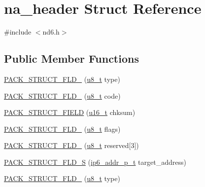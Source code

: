 \hypertarget{structna__header}{}\section{na\+\_\+header Struct Reference}
\label{structna__header}


{\ttfamily \#include $<$nd6.\+h$>$}

\subsection*{Public Member Functions}
\begin{DoxyCompactItemize}
\item 
\hyperlink{structna__header_a72b33d2b83b62ab3347fa764edf52257}{P\+A\+C\+K\+\_\+\+S\+T\+R\+U\+C\+T\+\_\+\+F\+L\+D\+\_} (\hyperlink{group__compiler__abstraction_ga4caecabca98b43919dd11be1c0d4cd8e}{u8\+\_\+t} type)
\item 
\hyperlink{structna__header_a15c81650ca42d8a731f841d642ee2bc0}{P\+A\+C\+K\+\_\+\+S\+T\+R\+U\+C\+T\+\_\+\+F\+L\+D\+\_} (\hyperlink{group__compiler__abstraction_ga4caecabca98b43919dd11be1c0d4cd8e}{u8\+\_\+t} code)
\item 
\hyperlink{structna__header_a3c32b9182b91d8d0962259ef43fe6f2f}{P\+A\+C\+K\+\_\+\+S\+T\+R\+U\+C\+T\+\_\+\+F\+I\+E\+LD} (\hyperlink{group__compiler__abstraction_ga77570ac4fcab86864fa1916e55676da2}{u16\+\_\+t} chksum)
\item 
\hyperlink{structna__header_a256bbbeb3f2818f2cddf77c9978600ee}{P\+A\+C\+K\+\_\+\+S\+T\+R\+U\+C\+T\+\_\+\+F\+L\+D\+\_} (\hyperlink{group__compiler__abstraction_ga4caecabca98b43919dd11be1c0d4cd8e}{u8\+\_\+t} flags)
\item 
\hyperlink{structna__header_aeafa2cf21dabf0a59da2640db4a9aacb}{P\+A\+C\+K\+\_\+\+S\+T\+R\+U\+C\+T\+\_\+\+F\+L\+D\+\_} (\hyperlink{group__compiler__abstraction_ga4caecabca98b43919dd11be1c0d4cd8e}{u8\+\_\+t} reserved\mbox{[}3\mbox{]})
\item 
\hyperlink{structna__header_ac6055f058c928dca86a74d6035d175cb}{P\+A\+C\+K\+\_\+\+S\+T\+R\+U\+C\+T\+\_\+\+F\+L\+D\+\_\+S} (\hyperlink{native_2lwip_2src_2include_2lwip_2prot_2ip6_8h_a560932a657f17ec5a0a3a78a1ce7e60a}{ip6\+\_\+addr\+\_\+p\+\_\+t} target\+\_\+address)
\item 
\hyperlink{structna__header_a72b33d2b83b62ab3347fa764edf52257}{P\+A\+C\+K\+\_\+\+S\+T\+R\+U\+C\+T\+\_\+\+F\+L\+D\+\_} (\hyperlink{group__compiler__abstraction_ga4caecabca98b43919dd11be1c0d4cd8e}{u8\+\_\+t} type)
\item 

\end{DoxyCompactItemize}
